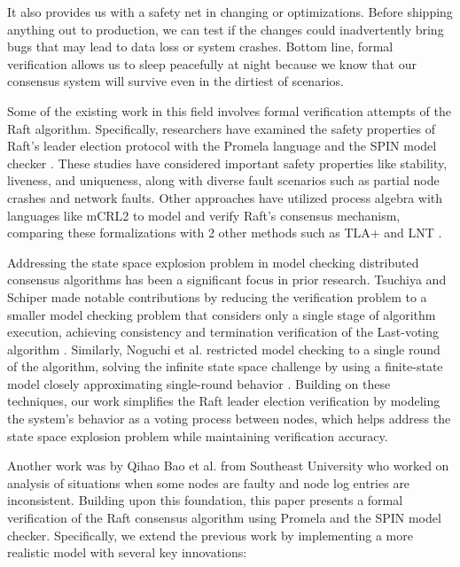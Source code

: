 \documentclass[a4paper]{llncs}
\begin{document}
It also provides us with a safety net in changing or optimizations. Before shipping anything out to production, we can test if the changes could inadvertently bring bugs that may lead to data loss or system crashes. Bottom line, formal verification allows us to sleep peacefully at night because we know that our consensus system will survive even in the dirtiest of scenarios.
    
    
    
Some of the existing work in this field involves formal verification attempts of the Raft algorithm. Specifically, researchers have examined the safety properties of Raft's leader election protocol with the Promela language and the SPIN model checker \cite{Qx1}. These studies have considered important safety properties like stability, liveness, and uniqueness, along with diverse fault scenarios such as partial node crashes and network faults. Other approaches have utilized process algebra with languages like mCRL2 to model and verify Raft's consensus mechanism, comparing these formalizations with 2 other methods such as TLA+ and LNT \cite{Qx3}. 

Addressing the state space explosion problem in model checking distributed consensus algorithms has been a significant focus in prior research. Tsuchiya and Schiper made notable contributions by reducing the verification problem to a smaller model checking problem that considers only a single stage of algorithm execution, achieving consistency and termination verification of the Last-voting algorithm \cite{Tsuchiya}. Similarly, Noguchi et al. restricted model checking to a single round of the algorithm, solving the infinite state space challenge by using a finite-state model closely approximating single-round behavior \cite{Noguchi}. Building on these techniques, our work simplifies the Raft leader election verification by modeling the system's behavior as a voting process between nodes, which helps address the state space explosion problem while maintaining verification accuracy.

Another work was by  Qihao Bao et al. from Southeast University  \cite{Qx2} who worked on analysis of situations when some
nodes are faulty and node log entries are inconsistent. 
Building upon this foundation, this paper presents a formal verification of the Raft consensus algorithm using Promela and the SPIN model checker. Specifically, we extend the previous work by implementing a more realistic model with several key innovations:
\end{document}

